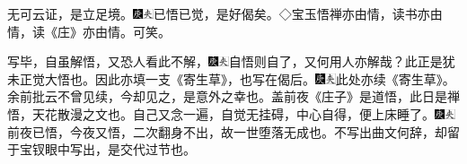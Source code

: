 无可云证，是立足境。{\includegraphics[width=3mm]{../Images/00004}\includegraphics[width=3mm]{../Images/00012}\footnotesize \kaishu 已悟已觉，是好偈矣。◇宝玉悟禅亦由情，读书亦由情，读《庄》亦由情。可笑。}

写毕，自虽解悟，又恐人看此不解，{\includegraphics[width=3mm]{../Images/00004}\includegraphics[width=3mm]{../Images/00012}\footnotesize \kaishu 自悟则自了，又何用人亦解哉？此正是犹未正觉大悟也。}因此亦填一支《寄生草》，也写在偈后。{\includegraphics[width=3mm]{../Images/00004}\includegraphics[width=3mm]{../Images/00012}\footnotesize \kaishu 此处亦续《寄生草》。余前批云不曾见续，今却见之，是意外之幸也。盖前夜《庄子》是道悟，此日是禅悟，天花散漫之文也。}自己又念一遍，自觉无挂碍，中心自得，便上床睡了。{\includegraphics[width=3mm]{../Images/00004}\includegraphics[width=3mm]{../Images/00012}\footnotesize \kaishu 前夜已悟，今夜又悟，二次翻身不出，故一世堕落无成也。不写出曲文何辞，却留于宝钗眼中写出，是交代过节也。}

